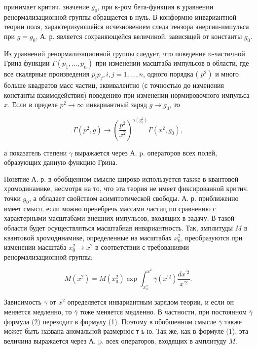 \documentclass[10pt]{article}
\begin{document}
принимает критич. значение $g_{0}$, при к-ром бета-функция в уравнении ренормализационной группы обращается в нуль. В конформно-инвариантной теории поля, характеризуюшейся исчезновением следа тензора энергии-импульса при $g=g_{0}$, А. р. является сохраняющейся величиной, зависящей от константы $g_{0}$.



Из уравнений ренормализационной группы следует, что поведение $n$-частичной Грина функции $\Gamma\left(p_{1}, \ldots, p_{n}\right)$ при изменении масштаба импульсов в области, где все скалярные произведения $p_{i} p_{j}, i, j=1, \ldots, n$, одного порядка ( $\left.p^{2}\right)$ и много больше квадратов масс частиц, эквивалентно (с точностью до изменения константы взаимодействия) поведению при изменении нормировочного импульса $x$. Если в пределе $p^{2} \rightarrow \infty$ инвариантный заряд $\bar{g} \rightarrow g_{0}$, то



\[

\Gamma\left(p^{2}, g\right) \rightarrow\left(\frac{p^{2}}{x^{2}}\right)^{\gamma\left(g_{0}^{2}\right)} \Gamma\left(x^{2}, g_{0}\right),

\]



а показатель степени $\gamma$ выражается через А. p. операторов всех полей, образующих данную функцию Грина.



Понятие А. р. в обобщенном смысле широко используется также в квантовой хромодинамике, несмотря на то, что эта теория не имеет фиксированной критич. точки $g_{0}$, а обладает свойством асимптотической свободы. А. р. приближенно имеет смысл, если можно пренебречь массами частиц по сравнению с характерными масштабами внешних импульсов, входящих в задачу. В такой области будет осуществляться масштабная инвариантность. Так, амплитуды $M$ в квантовой хромодинамике, определенные на масштабах $x_{0}^{2}$, преобразуются при изменении масштаба $x_{0}^{2} \rightarrow x^{2}$ в соответствии с требованиями ренормализационной группы:



\[

M\left(x^{2}\right)=M\left(x_{0}^{2}\right) \exp \int_{x_{0}^{2}}^{x^{2}} \bar{\gamma}\left(x^{\prime 2}\right) \frac{d x^{\prime 2}}{x^{\prime 2}} .

\]



Зависимость $\bar{\gamma}$ от $x^{2}$ определяется инвариантным зарядом теории, и если он меняется медленно, то $\bar{\gamma}$ тоже меняется медленно. В частности, при постоянном $\bar{\gamma}$ формула (2) переходит в формулу (1). Поэтому в обобшенном смысле $\bar{\gamma}$ также может быть названа аномальной размернос т ь ю. Так же, как в формуле (1), эта величина выражается через А. p. всех операторов, входящих в амплитуду $M$.
\end{document}
